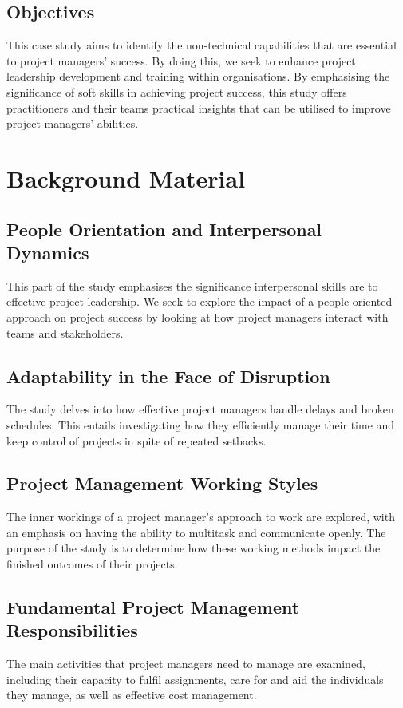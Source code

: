 \documentclass{article}
\begin{document}
\subsection{Objectives}
This case study aims to identify the non-technical capabilities that are essential to project managers' success. By doing this, we seek to enhance project leadership development and training within organisations. By emphasising the significance of soft skills in achieving project success, this study offers practitioners and their teams practical insights that can be utilised to improve project managers' abilities.

\section{Background Material}
\subsection{People Orientation and Interpersonal Dynamics}
This part of the study emphasises the significance interpersonal skills are to effective project leadership. We seek to explore the impact of a people-oriented approach on project success by looking at how project managers interact with teams and stakeholders.


\subsection{Adaptability in the Face of Disruption}
The study delves into how effective project managers handle delays and broken schedules. This entails investigating how they efficiently manage their time and keep control of projects in spite of repeated setbacks.

\subsection{Project Management Working Styles}
The inner workings of a project manager's approach to work are explored, with an emphasis on having the ability to multitask and communicate openly. The purpose of the study is to determine how these working methods impact the finished outcomes of their projects.

\subsection{Fundamental Project Management Responsibilities}
The main activities that project managers need to manage are examined, including their capacity to fulfil assignments, care for and aid the individuals they manage, as well as effective cost management.
\end{document}
